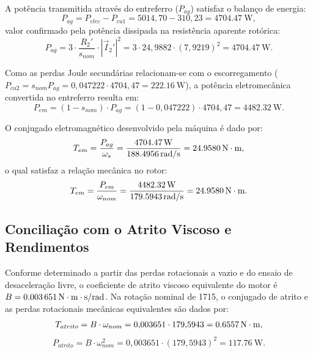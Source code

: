 A potência transmitida através do entreferro ($P_{ag}$) satisfaz o balanço de energia:
\begin{equation}
P_{ag} = P_{elec} - P_{cu1} = 5014{,}70 - 310{,}23 = \SI{4704,47}{\watt},
\label{eq:potencia_entreferro_conservacao}
\end{equation}
valor confirmado pela potência dissipada na resistência aparente rotórica:
\begin{equation}
P_{ag} = 3 \cdot \frac{R_2'}{s_{nom}} \cdot |\vec{I}_2'|^2 = 3 \cdot 24{,}9882 \cdot (7{,}9219)^2 = \SI{4704,47}{\watt}.
\label{eq:potencia_entreferro_rotor}
\end{equation}

Como as perdas Joule secundárias relacionam-se com o escorregamento ($P_{cu2} = s_{nom} P_{ag} = 0{,}047222 \cdot 4704{,}47 = \SI{222,16}{\watt}$), a potência eletromecânica convertida no entreferro resulta em:
\begin{equation}
P_{em} = (1 - s_{nom}) \cdot P_{ag} = (1 - 0{,}047222) \cdot 4704{,}47 = \SI{4482,32}{\watt}.
\label{eq:potencia_eletromecanica_nominal}
\end{equation}

O conjugado eletromagnético desenvolvido pela máquina é dado por:
\begin{equation}
T_{em} = \frac{P_{ag}}{\omega_s} = \frac{\SI{4704,47}{\watt}}{\SI{188,4956}{\mathrm{rad/s}}} = \SI{24,9580}{\mathrm{N\cdot m}},
\label{eq:torque_eletromagnetico_nominal}
\end{equation}
o qual satisfaz a relação mecânica no rotor:
\begin{equation}
T_{em} = \frac{P_{em}}{\omega_{nom}} = \frac{\SI{4482,32}{\watt}}{\SI{179,5943}{\mathrm{rad/s}}} = \SI{24,9580}{\mathrm{N\cdot m}}.
\label{eq:torque_rotor_verificacao}
\end{equation}

\subsection{Conciliação com o Atrito Viscoso e Rendimentos}\label{subsec:atrito_rendimento_nominal}

Conforme determinado a partir das perdas rotacionais a vazio e do ensaio de desaceleração livre, o coeficiente de atrito viscoso equivalente do motor é $B = \SI{0,003651}{\mathrm{N\cdot m}\cdot\second/\radian}$. Na rotação nominal de \SI{1715}{\RPM}, o conjugado de atrito e as perdas rotacionais mecânicas equivalentes são dados por:
\begin{equation}
T_{atrito} = B \cdot \omega_{nom} = 0{,}003651 \cdot 179{,}5943 = \SI{0,6557}{\mathrm{N\cdot m}},
\label{eq:torque_atrito_nominal_resolucao}
\end{equation}
\begin{equation}
P_{atrito} = B \cdot \omega_{nom}^2 = 0{,}003651 \cdot (179{,}5943)^2 = \SI{117,76}{\watt}.
\label{eq:perdas_rotacionais_viscosas}
\end{equation}

